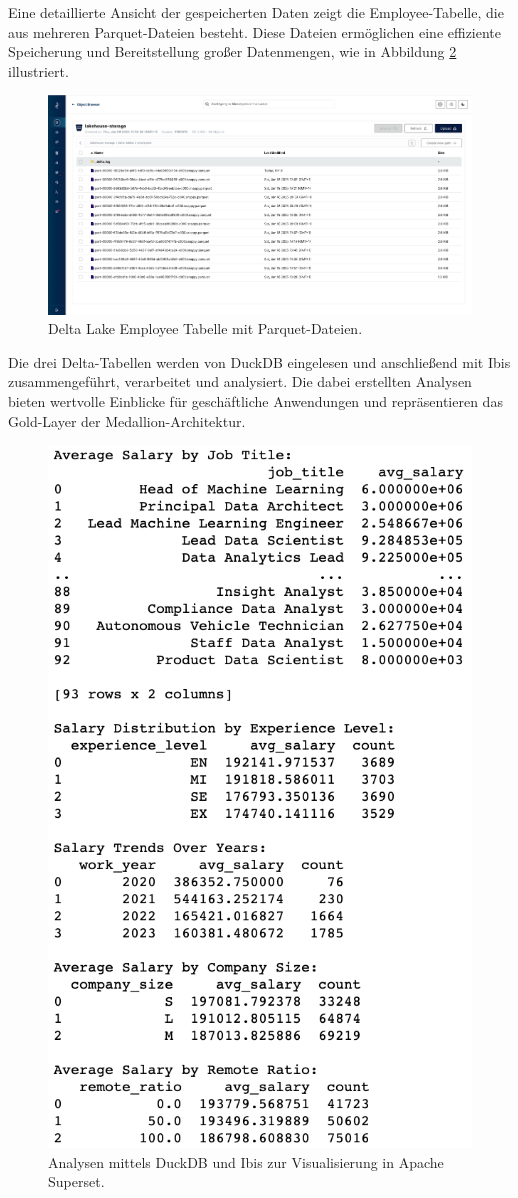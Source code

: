 Eine detaillierte Ansicht der gespeicherten Daten zeigt die Employee-Tabelle, die aus mehreren Parquet-Dateien besteht. Diese Dateien ermöglichen eine effiziente Speicherung und Bereitstellung großer Datenmengen, wie in Abbildung \ref{fig:Delta-Employee-Table} illustriert.

\begin{figure}[H]
    \centering
    \includegraphics[width=1\linewidth]{graphics/delta-folder-employees.png}
    \caption[Delta Lake Employee Tabelle mit Parquet-Dateien]{Delta Lake Employee Tabelle mit Parquet-Dateien.}
    \label{fig:Delta-Employee-Table}
\end{figure}

Die drei Delta-Tabellen werden von DuckDB eingelesen und anschließend mit Ibis zusammengeführt, verarbeitet und analysiert. Die dabei erstellten Analysen bieten wertvolle Einblicke für geschäftliche Anwendungen und repräsentieren das Gold-Layer der Medallion-Architektur. 

\begin{figure}[H]
    \centering
    \includegraphics[width=0.5\linewidth]{graphics/analysen.png}
    \caption[Analysen mittels DuckDB und Ibis zur Visualisierung in Apache Superset]{Analysen mittels DuckDB und Ibis zur Visualisierung in Apache Superset.}
    \label{fig:Delta-Employee-Table}
\end{figure}

